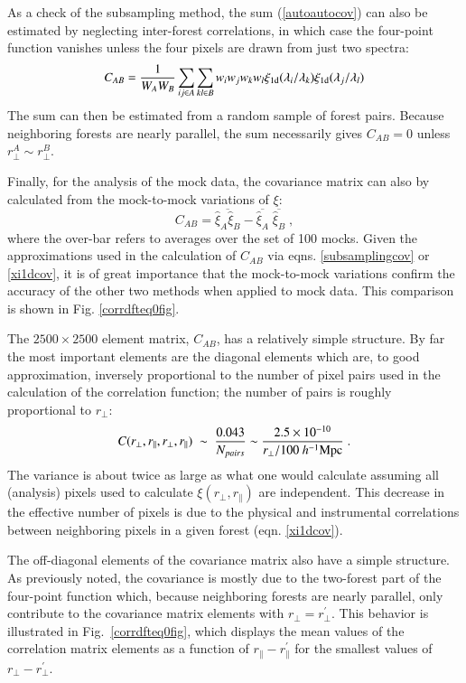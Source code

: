 \documentclass{aa}
\newcommand{\xionedim}{\xi_{\rm 1d}}
\newcommand{\hMpc}{h^{-1}{\rm Mpc}}
\newcommand{\rperp}{r_\perp}
\newcommand{\rpar}{r_\parallel}
\begin{document}
As a check of the subsampling method,
the sum (\ref{autoautocov})
can also be estimated by 
neglecting inter-forest correlations, 
in which case the four-point function vanishes unless
the four pixels are drawn from just two spectra:
\begin{equation}
C_{AB} =
\frac{1}{W_AW_B}
\sum_{ij\in A}\sum_{kl\in B} w_iw_j w_kw_l 
\xionedim(\lambda_i/\lambda_k)\xionedim(\lambda_j/\lambda_l)
\label{xi1dcov}
\end{equation}
The sum can then be estimated
from a random sample of forest pairs.
  Because neighboring forests are nearly parallel, the sum
  necessarily gives $C_{AB}=0$ unless $\rperp^A\sim\rperp^B$.


Finally,
for the analysis of the mock data, the covariance matrix can
also by calculated from the mock-to-mock variations of $\xi$:
\begin{equation}
C_{AB} =
\overline{ \hat\xi_A \hat\xi_B} -
\overline{\hat\xi_A} \; \overline{\hat\xi_B}
  \;,
\label{mocktomockcov}
\end{equation}
where the over-bar refers to averages over the set of 100 mocks.
Given the approximations used in the calculation of $C_{AB}$
via eqns. \ref{subsamplingcov} or \ref{xi1dcov},
it is of great importance that the mock-to-mock variations
confirm the accuracy of the other two methods when applied
to mock data.
This comparison is shown in Fig. \ref{corrdfteq0fig}.


The $2500\times2500$ element matrix, $C_{AB}$, has a relatively 
simple structure.
By far the most important elements are the diagonal elements
which are, to good approximation, inversely proportional to
the number of pixel pairs used in the calculation of the correlation
function; the number of pairs is roughly proportional to $\rperp$:
\begin{equation}
C(\rperp,\rpar,\rperp,\rpar) \;\sim\;\frac{0.043}{N_{pairs}}
\sim \frac{2.5\times10^{-10}}{\rperp/100~\hMpc}
\; .
\label{varianceauto}
\end{equation}
The variance is about twice as large as what one would calculate assuming
all (analysis) pixels used to calculate $\xi(\rperp,\rpar)$ are independent.
This decrease in the effective number of pixels
is due to the physical and instrumental correlations between neighboring
pixels in a given forest (eqn. \ref{xi1dcov}).



The off-diagonal elements of the covariance matrix also have
a simple structure.
As previously noted,
the covariance is mostly due to the two-forest part
of the four-point function which, because neighboring
forests are nearly parallel, only 
contribute to the covariance matrix elements with
$\rperp=\rperp^\prime$.
This behavior is illustrated in Fig.~\ref{corrdfteq0fig},
which displays
the mean values of the 
correlation matrix elements
as a function of $\rpar-\rpar^\prime$ 
for the smallest values of $\rperp-\rperp^\prime$.
\end{document}
